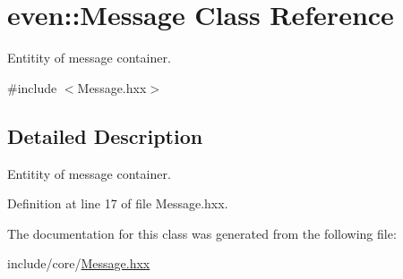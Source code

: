 \hypertarget{classeven_1_1_message}{}\section{even\+:\+:Message Class Reference}
\label{classeven_1_1_message}


Entitity of message container.  




{\ttfamily \#include $<$Message.\+hxx$>$}



\subsection{Detailed Description}
Entitity of message container. 

Definition at line 17 of file Message.\+hxx.



The documentation for this class was generated from the following file\+:\begin{DoxyCompactItemize}
\item 
include/core/\mbox{\hyperlink{_message_8hxx}{Message.\+hxx}}\end{DoxyCompactItemize}
